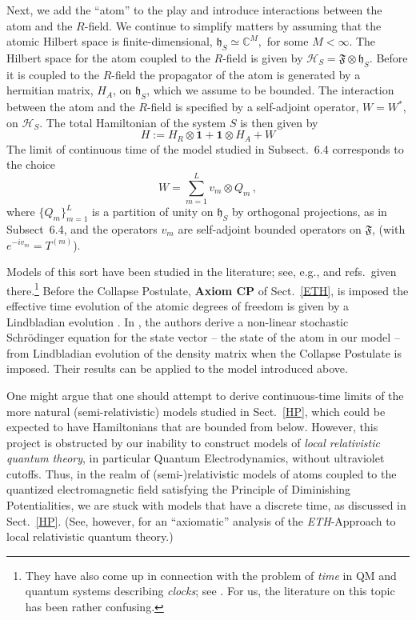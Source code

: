 \documentclass[12pt]{article}
\begin{document}
{Next, we add the ``atom'' to the play and introduce interactions between the atom and the $R$-field. We continue to simplify matters by assuming that the atomic Hilbert space is finite-dimensional, $\mathfrak{h}_S\simeq \mathbb{C}^{M},$ for some $M< \infty$. The Hilbert space for the atom coupled to the $R$-field is given by $\mathcal{H}_S = \mathfrak{F}\otimes \mathfrak{h}_S$. Before it is coupled to the $R$-field the propagator of the atom is generated by a hermitian matrix, $H_A$, on $\mathfrak{h}_S$, which we assume to be bounded. The interaction between the atom and the $R$-field is specified by a self-adjoint operator, $W=W^{*}$,
on $\mathcal{H}_S$. The total Hamiltonian of the system $S$ is then given by
\begin{equation}\label{Ham}
H:= H_R\otimes \mathbf{1} + \mathbf{1}\otimes H_A + W
\end{equation}
The limit of continuous time of the model studied in Subsect.~6.4 corresponds to the choice
$$W= \sum_{m=1}^{L} v_m\otimes Q_m\,,$$
where $\big\{Q_m\big\}_{m=1}^{L}$ is a partition of unity on $\mathfrak{h}_S$ by orthogonal projections, as in Subsect~6.4, and the operators $v_m$ are self-adjoint bounded operators on $\mathfrak{F}$, (with $e^{-iv_m} = T^{(m)}$).

Models of this sort have been studied in the literature; see, e.g., \cite{H-P, FGH} and refs.~given there.\footnote{They have also come up in connection with the problem of \textit{time} in QM and quantum systems describing \textit{clocks}; see \cite{clocks}. For us, the literature on this topic has been rather confusing.} Before the Collapse Postulate, {\bf{Axiom CP}} of Sect.~\ref{ETH}, is imposed the effective time evolution of the atomic degrees of freedom is given by a Lindbladian evolution \cite{GKS, Lindblad}. In \cite{Bassi}, the authors derive a non-linear stochastic Schr\"odinger equation for the state vector -- the state of the atom in our model -- from Lindbladian evolution of the density matrix when the Collapse Postulate is imposed. Their results can be applied to the model introduced above.

One might argue that one should attempt to derive continuous-time limits of the more natural (semi-relativistic) models studied in Sect.~\ref{HP}, which could be expected to have Hamiltonians that are bounded from below. However, this project is obstructed by our inability to construct models of \textit{local relativistic quantum theory}, in particular Quantum Electrodynamics, without ultraviolet cutoffs. Thus, in the realm of (semi-)relativistic models of atoms coupled to the quantized electromagnetic field satisfying the Principle of Diminishing Potentialities, we are stuck with models that have a discrete time, as discussed in Sect.~\ref{HP}. (See, however, \cite{Fr2} for an ``axiomatic'' analysis of the \textit{ETH}-Approach to local relativistic quantum theory.)

}
\end{document}
